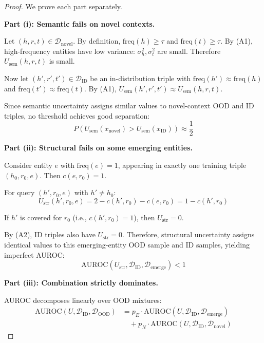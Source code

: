 \begin{proof}
We prove each part separately.

\textbf{Part (i): Semantic fails on novel contexts.}

Let $(h,r,t) \in \mathcal{D}_{\text{novel}}$. By definition, $\text{freq}(h) \geq \tau$ and $\text{freq}(t) \geq \tau$.
By (A1), high-frequency entities have low variance: $\sigma^2_h, \sigma^2_t$ are small.
Therefore $U_{\text{sem}}(h,r,t)$ is small.

Now let $(h',r',t') \in \mathcal{D}_{\text{ID}}$ be an in-distribution triple with $\text{freq}(h') \approx \text{freq}(h)$ and $\text{freq}(t') \approx \text{freq}(t)$.
By (A1), $U_{\text{sem}}(h',r',t') \approx U_{\text{sem}}(h,r,t)$.

Since semantic uncertainty assigns similar values to novel-context OOD and ID triples, no threshold achieves good separation:
\begin{equation}
    P(U_{\text{sem}}(x_{\text{novel}}) > U_{\text{sem}}(x_{\text{ID}})) \approx \frac{1}{2}
\end{equation}

\textbf{Part (ii): Structural fails on some emerging entities.}

Consider entity $e$ with $\text{freq}(e) = 1$, appearing in exactly one training triple $(h_0, r_0, e)$.
Then $c(e, r_0) = 1$.

For query $(h', r_0, e)$ with $h' \neq h_0$:
\begin{equation}
    U_{\text{str}}(h', r_0, e) = 2 - c(h', r_0) - c(e, r_0) = 1 - c(h', r_0)
\end{equation}

If $h'$ is covered for $r_0$ (i.e., $c(h', r_0) = 1$), then $U_{\text{str}} = 0$.

By (A2), ID triples also have $U_{\text{str}} = 0$.
Therefore, structural uncertainty assigns identical values to this emerging-entity OOD sample and ID samples, yielding imperfect AUROC:
\begin{equation}
    \text{AUROC}(U_{\text{str}}, \mathcal{D}_{\text{ID}}, \mathcal{D}_{\text{emerge}}) < 1
\end{equation}

\textbf{Part (iii): Combination strictly dominates.}

AUROC decomposes linearly over OOD mixtures:
\begin{align}
    \text{AUROC}(U, \mathcal{D}_{\text{ID}}, \mathcal{D}_{\text{OOD}}) &= p_E \cdot \text{AUROC}(U, \mathcal{D}_{\text{ID}}, \mathcal{D}_{\text{emerge}}) \nonumber \\
    &\quad + p_N \cdot \text{AUROC}(U, \mathcal{D}_{\text{ID}}, \mathcal{D}_{\text{novel}})
\end{align}


\end{proof}
